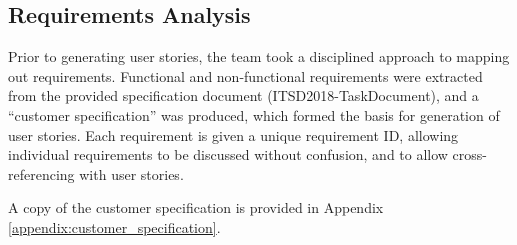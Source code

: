 \subsection{Requirements Analysis}

Prior to generating user stories, the team took a disciplined approach to mapping out requirements.
Functional and non-functional requirements were extracted from the provided specification document (ITSD2018-TaskDocument), and a ``customer specification'' was produced, which formed the basis for generation of user stories.
Each requirement is given a unique requirement ID, allowing individual requirements to be discussed without confusion, and to allow cross-referencing with user stories.

A copy of the customer specification is provided in Appendix \ref{appendix:customer_specification}.
